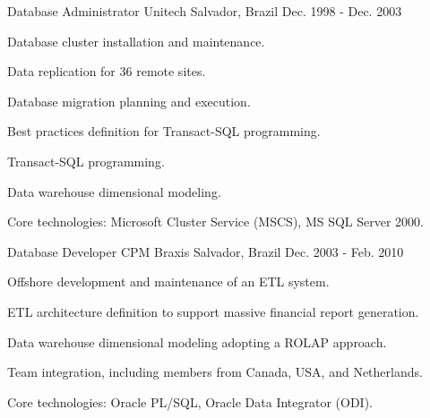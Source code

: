 \begin{cventries}
\cventry
{Database Administrator} %
{Unitech} %
{Salvador, Brazil} %
{Dec. 1998 - Dec. 2003} %
{ %
\begin{cvitems}
	\item{Database cluster installation and maintenance.}
	\item{Data replication for 36 remote sites.} 
	\item{Database migration planning and execution.}
	\item{Best practices definition for Transact-SQL programming.}
	\item{Transact-SQL programming.}
	\item{Data warehouse dimensional modeling.}
	\item{Core technologies: Microsoft Cluster Service (MSCS), MS SQL Server 2000.}
\end{cvitems}
}


\cventry
{Database Developer} %
{CPM Braxis} %
{Salvador, Brazil} %
{Dec. 2003 - Feb. 2010} %
{ %
\begin{cvitems}
\item{Offshore development and maintenance of an ETL system.} 
\item{ETL architecture definition to support massive financial report generation.} 
\item{Data warehouse dimensional modeling adopting a ROLAP approach.}
\item{Team integration, including members from Canada, USA, and Netherlands.}
\item{Core technologies: Oracle PL/SQL, Oracle Data Integrator (ODI).}
\end{cvitems}
}


\end{cventries}